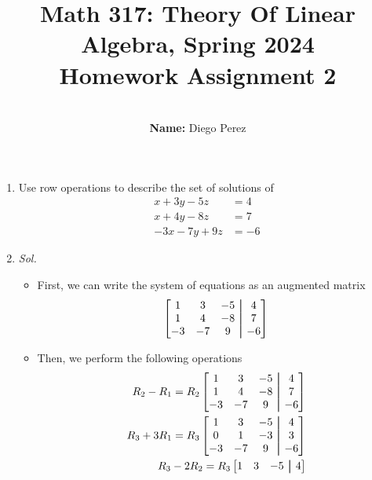 \documentclass[11pt]{article}
\newcommand{\aug}{\fboxsep=-\fboxrule\!\!\!\fbox{\strut}\!\!\!}
\begin{document}
	\title{Math 317: Theory Of Linear Algebra, Spring 2024\\ Homework Assignment
	2}
	\author{\\ \textbf{Name:}
	Diego Perez}
	\date{}
	\maketitle

\begin{enumerate}
	\item Use row operations to describe the set of solutions of
	\begin{align*}
    x + 3 y - 5 z & = 4 \\
		x + 4 y - 8 z & = 7 \\
		-3x - 7 y + 9 z & = -6
	\end{align*}
\item[] \textit{ Sol. }
  \begin{itemize}
    \item[] First, we can write the system of equations as an augmented matrix \begin{align*}
      \begin{bmatrix}
        1 & 3 & -5 &\aug& 4 \\
        1 & 4 & -8 &\aug& 7 \\
        -3 & -7 & 9&\aug& -6 \\
      \end{bmatrix}
      \end{align*}
    \item[] Then, we perform the following operations \begin{align*}
      {R_2 - R_1 = R_2}
      \begin{bmatrix}
      1 & 3 & -5 &\aug& 4 \\
      1 & 4 & -8 &\aug& 7 \\
      -3 & -7 & 9&\aug& -6 \\
      \end{bmatrix}\\
      {R_3 + 3R_1 = R_3}
      \begin{bmatrix}
      1 & 3 & -5 &\aug& 4 \\
      0 & 1 & -3 &\aug& 3 \\
      -3 & -7 & 9&\aug& -6 \\
      \end{bmatrix}\\
      R_3 - 2R_2 = R_3
      \begin{bmatrix}
      1 & 3 & -5 &\aug& 4 \\

\end{bmatrix}
\end{align*}
\end{itemize}
\end{enumerate}
\end{document}
